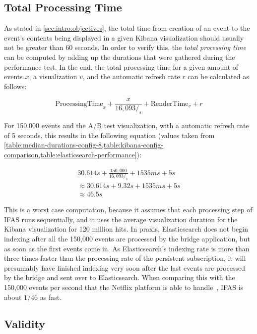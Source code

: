 \subsection{Total Processing Time}
\label{subsec:evaluation:performance:total-processing-time}

As stated in \cref{sec:intro:objectives}, the total time from creation of an event to the event's contents being displayed in a given Kibana visualization should usually not be greater than 60 seconds.
In order to verify this, the \emph{total processing time} can be computed by adding up the durations that were gathered during the performance test.
In the end, the total processing time for a given amount of events $x$, a visualization $v$, and the automatic refresh rate $r$ can be calculated as follows:

$$ \text{ProcessingTime}_x + \frac{x}{16,093/_s} + \text{RenderTime}_v + r$$

For 150,000 events and the A/B test visualization, with a automatic refresh rate of 5 seconds, this results in the following equation (values taken from \cref{table:median-durations-config-8,table:kibana-config-comparison,table:elasticsearch-performance}):

\begin{align*}
30.614s + \frac{150,000}{16,093/_s} + 1535ms + 5s \\
\approx 30.614s + 9.32s + 1535ms + 5s \\
\approx 46.5s 
\end{align*}

This is a worst case computation, because it assumes that each processing step of \ac{IFAS} runs sequentially, and it uses the average visualization duration for the Kibana visualization for 120 million hits.
In praxis, Elasticsearch does not begin indexing after all the 150,000 events are processed by the bridge application, but as soon as the first events come in.
As Elasticsearch's indexing rate is more than three times faster than the processing rate of the persistent subscription, it will presumably have finished indexing very soon after the last events are processed by the bridge and sent over to Elasticsearch.
When comparing this with the 150,000 events per second that the Netflix platform is able to handle~\cite{WEB:Netflix:2016}, \ac{IFAS} is about $1/46$ as fast.

\subsection{Validity}
\label{subec:evaluation:user:validity}

